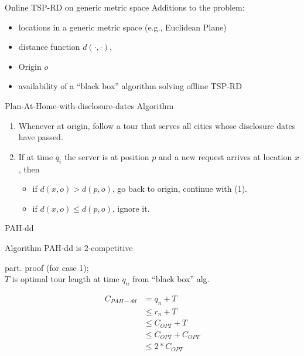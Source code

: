 \documentclass{beamer}
\begin{document}
\begin{frame}{Online TSP-RD on generic metric space}
  Additions to the problem:
  \begin{itemize}
    \item locations in a generic metric space (e.g., Euclidean Plane)
    \item distance function $d(\cdotp,\cdotp)$, 
    \item Origin $o$
    \item availability of a ``black box'' algorithm solving offline TSP-RD
  \end{itemize}
  \vspace{5pt}

  \begin{block}{Plan-At-Home-with-disclosure-dates Algorithm}
    \begin{enumerate}
      \item Whenever at origin, follow a tour that serves all cities whose disclosure dates have passed.
      \item If at time $q_i$ the server is at position $p$ and a new request arrives at location $x$, then
      \begin{itemize}
        \item if $d(x,o) > d(p,o)$, go back to origin, continue with (1).
        \item if $d(x,o) \le d(p,o)$, ignore it.
      \end{itemize}
    \end{enumerate}
  \end{block}
\end{frame}

\begin{frame}{PAH-dd}
  \begin{Theorem}
    Algorithm PAH-dd is 2-competitive
  \end{Theorem}
  \begin{Proof}
    part. proof (for case 1);\\
    $T$ is optimal tour length at time $q_n$ from ``black box'' alg.
    \begin{small}
    \begin{align}
      C_{PAH-dd} & =  q_n + T \\
		 &\le r_n + T \\
		 &\le C_{OPT} + T \\
		 &\le C_{OPT} + C_{OPT} \\
		 &\le 2* C_{OPT}
    \end{align}
    \end{small}
  \end{Proof}
\end{frame}
\end{document}
